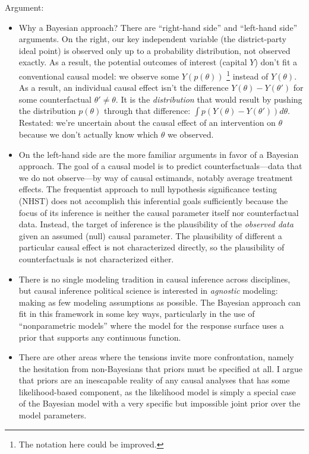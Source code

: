 \documentclass[12pt
              ]{article}
\begin{document}
Argument:
\begin{itemize}
  \item Why a Bayesian approach? There are ``right-hand side'' and ``left-hand side'' arguments.
  On the right, our key independent variable (the district-party ideal point) is observed only up to a probability distribution, not observed exactly.
  As a result, the potential outcomes of interest (capital $Y$) don't fit a conventional causal model: we observe some $Y(p(\theta))$%
  \footnote{
    The notation here could be improved.
  }
  instead of $Y(\theta)$.
  As a result, an individual causal effect isn't the difference $Y(\theta) - Y(\theta')$ for some counterfactual $\theta' \neq \theta$.
  It is the \emph{distribution} that would result by pushing the distribution $p(\theta)$ through that difference: $\displaystyle \int p(Y(\theta) - Y(\theta'))d\theta$.
  Restated: we're uncertain about the causal effect of an intervention on $\theta$ because we don't actually know which $\theta$ we observed.
  \item On the left-hand side are the more familiar arguments in favor of a Bayesian approach.
  The goal of a causal model is to predict counterfactuals---data that we do not observe---by way of causal estimands, notably average treatment effects.
  The frequentist approach to null hypothesis significance testing (NHST) does not accomplish this inferential goals sufficiently because the focus of its inference is neither the causal parameter itself nor counterfactual data.
  Instead, the target of inference is the plausibility of the \emph{observed data} given an assumed (null) causal parameter.
  The plausibility of different a particular causal effect is not characterized directly, so the plausibility of counterfactuals is not characterized either.
  \item There is no single modeling tradition in causal inference across disciplines, but causal inference political science is interested in \emph{agnostic} modeling: making as few modeling assumptions as possible.
  The Bayesian approach can fit in this framework in some key ways, particularly in the use of ``nonparametric models'' where the model for the response surface uses a prior that supports any continuous function.
  \item There are other areas where the tensions invite more confrontation, namely the hesitation from non-Bayesians that priors must be specified at all.
  I argue that priors are an inescapable reality of any causal analyses that has some likelihood-based component, as the likelihood model is simply a special case of the Bayesian model with a very specific but impossible joint prior over the model parameters.

\end{itemize}
\end{document}
